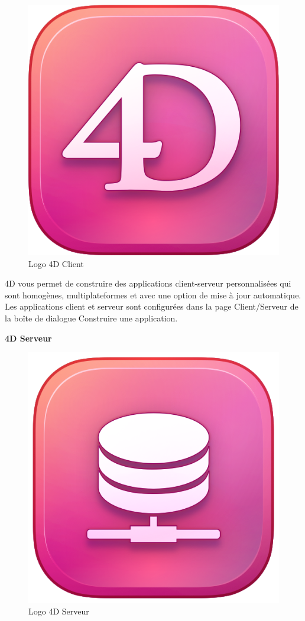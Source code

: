 \begin{figure}[htbp]
   \centering
   \includegraphics[scale=0.2]{Images/4dcl.png} 
   \caption{Logo 4D Client}
   \label{fig:4dcl}
\end{figure}

4D vous permet de construire des applications client-serveur 
personnalisées qui sont homogènes, multiplateformes et avec 
une option de mise à jour automatique. Les applications 
client et serveur sont configurées dans la page Client/Serveur 
de la boîte de dialogue Construire une application.
\newline

\large 
\textbf{4D Serveur}

\begin{figure}[htbp]
   \centering
   \includegraphics[scale=0.2]{Images/4dsrv.png} 
   \caption{Logo 4D Serveur}
   \label{fig:4dsrv}
\end{figure}

